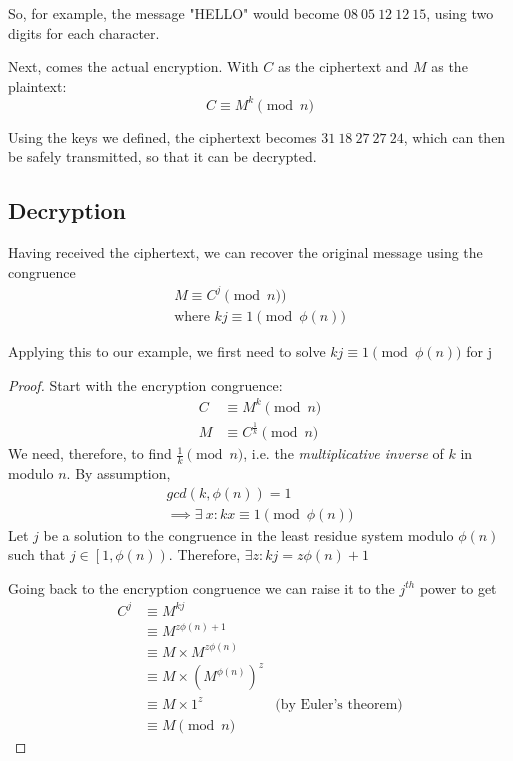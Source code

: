 \documentclass[12pt, titlepage]{article}
\begin{document}
    So, for example, the message "HELLO" would become $08\ 05\ 12\ 12\ 15$,
    using two digits for each character.

    Next, comes the actual encryption. With $C$ as the ciphertext and $M$ as the
    plaintext:
    \begin{equation*}
        C \equiv M^{k} \pmod{n}
    \end{equation*}

    Using the keys we defined, the ciphertext becomes $31\ 18\ 27\ 27\ 24$,
    which can then be safely transmitted, so that it can be decrypted.

    \subsection{Decryption}
    Having received the ciphertext, we can recover the original message using
    the congruence
    \begin{align*}
        M \equiv C^j \pmod{n})\\
        \text{where } kj \equiv 1 \pmod{\phi (n)}
    \end{align*}

    Applying this to our example, we first need to solve $
    kj \equiv 1 \pmod{\phi (n)}$ for j

    \begin{proof}
        Start with the encryption congruence: 
        \begin{align*}
            C & \equiv M^{k} \pmod{n}\\
            M & \equiv C^{\frac{1}{k}} \pmod{n}
        \end{align*}
        We need, therefore, to find $\frac{1}{k} \pmod{n}$, i.e. the
        \emph{multiplicative inverse} of $k$ in modulo $n$. By assumption, 
        \begin{align*}
            gcd(k, \phi (n)) = 1 \\
            \implies \exists\ x: kx \equiv 1 \pmod{\phi (n)}
        \end{align*}
        Let $j$ be a solution to the congruence in the least residue system
        modulo $\phi (n)$ such that $j \in \left[1, \phi (n) \right)$.
        Therefore, $\exists z: kj = z\phi (n) + 1$

        Going back to the encryption congruence we can raise it to the $j^{th}$
        power to get
        \begin{align*}
            C^j & \equiv M^{kj}\\ 
                & \equiv M^{z\phi (n) + 1}\\
                & \equiv M\times M^{z \phi(n)}\\
                & \equiv M\times (M^{\phi (n)})^z\\
                & \equiv M\times 1^z                &\text{(by Euler's theorem)}\\
                & \equiv M \pmod{n}
        \end{align*}
    \end{proof}
\end{document}
